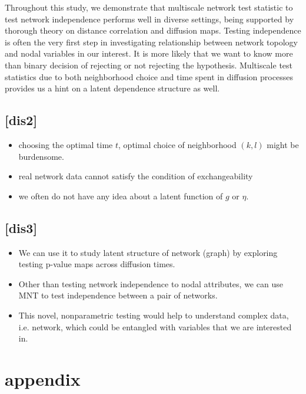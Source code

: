 \documentclass[12pt]{article}
\theoremstyle{definition}
\begin{document}
Throughout this study, we demonstrate that multiscale network test statistic to test network independence performs well in diverse settings, being supported by thorough theory on distance correlation and diffusion maps. 
Testing independence is often the very first step in investigating relationship between network topology and nodal variables in our interest. It is more likely that we want to know more than binary decision of rejecting or not rejecting the hypothesis. Multiscale test statistics due to both neighborhood choice and time spent in diffusion processes provides us a hint on a latent dependence structure as well.  


\subsection{[dis2]}

\begin{itemize}
	\item choosing the optimal time $t$, optimal choice of neighborhood $(k,l)$ might be burdensome. 
	\item real network data cannot satisfy the condition of exchangeability
	\item we often do not have any idea about a latent function of $g$ or $\eta$.
\end{itemize}	



\subsection{[dis3]}


\begin{itemize}
	\item We can use it to study latent structure of network (graph) by exploring testing p-value maps across diffusion times.
	\item Other than testing network independence to nodal attributes, we can use MNT to test independence between a pair of networks.  
	\item This novel, nonparametric testing would help to understand complex data, i.e. network, which could be entangled with variables that we are interested in. 
\end{itemize}	





\newpage
\appendix
\section{appendix}
\end{document}
